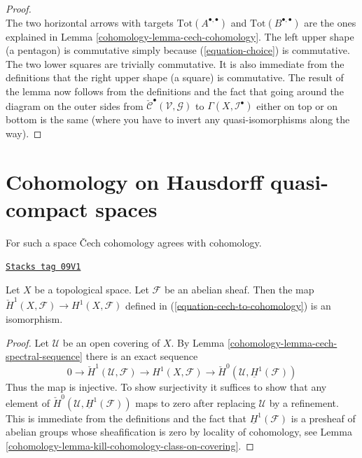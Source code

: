 \begin{proof}
$$$$
The two horizontal arrows with targets $\text{Tot}(A^{\bullet, \bullet})$ and
$\text{Tot}(B^{\bullet, \bullet})$
are the ones explained in Lemma \ref{cohomology-lemma-cech-cohomology}.
The left upper shape (a pentagon) is commutative simply
because (\ref{equation-choice}) is commutative.
The two lower squares are trivially commutative.
It is also immediate from the definitions that the
right upper shape (a square) is commutative.
The result of the lemma now follows from the definitions
and the fact that going around the diagram on the outer sides
from $\check{\mathcal{C}}^\bullet(\mathcal{V}, \mathcal{G})$
to $\Gamma(X, \mathcal{I}^\bullet)$ either on top or on bottom
is the same (where you have to invert any quasi-isomorphisms along the way).
\end{proof}

\section{Cohomology on Hausdorff quasi-compact spaces}
\label{cohomology-section-cohomology-LC}
For such a space {\v C}ech cohomology agrees with cohomology.

\begin{lemma}
\label{cohomology-lemma-cech-always}
\href{https://stacks.math.columbia.edu/tag/09V1}{\texttt{Stacks tag 09V1}}

Let $X$ be a topological space. Let $\mathcal{F}$ be an abelian sheaf. Then
the map $\check{H}^1(X, \mathcal{F}) \to H^1(X, \mathcal{F})$ defined
in (\ref{equation-cech-to-cohomology}) is an isomorphism.
\end{lemma}

\begin{proof}

Let $\mathcal{U}$ be an open covering of $X$.
By Lemma \ref{cohomology-lemma-cech-spectral-sequence}
there is an exact sequence
$$
0 \to \check{H}^1(\mathcal{U}, \mathcal{F}) \to H^1(X, \mathcal{F})
\to \check{H}^0(\mathcal{U}, \underline{H}^1(\mathcal{F}))
$$
Thus the map is injective. To show surjectivity it suffices to show that
any element of $\check{H}^0(\mathcal{U}, \underline{H}^1(\mathcal{F}))$
maps to zero after replacing $\mathcal{U}$ by a refinement.
This is immediate from the definitions and the fact that
$\underline{H}^1(\mathcal{F})$ is a presheaf of abelian groups
whose sheafification is zero by locality of cohomology, see
Lemma \ref{cohomology-lemma-kill-cohomology-class-on-covering}.
\end{proof}

